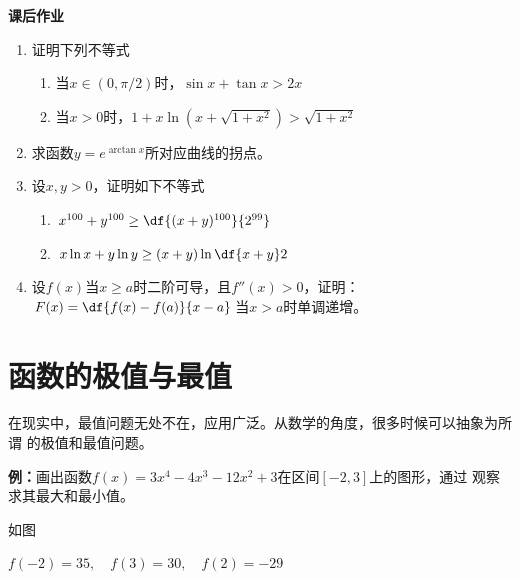 \begin{ext}
	{\bf 课后作业}
	
	\begin{enumerate}
	  \item 证明下列不等式
		\begin{enumerate}[(1)]
		  \item 当$x\in(0,\pi/2)$时，$\sin x+\tan x>2x$
		  \item 当$x>0$时，$1+x\ln(x+\sqrt{1+x^2})>\sqrt{1+x^2}$
		\end{enumerate}
	  \item 求函数$y=e^{\arctan x}$所对应曲线的拐点。
	  \item 设$x,y>0$，证明如下不等式
	  \begin{enumerate}[(1)]
		\item $x^{100}+y^{100}\geq\df{(x+y)^{100}}{2^{99}}$
		\item $x\ln x+y\ln y\geq (x+y)\ln\df{x+y}2$
	  \end{enumerate}
	  \item 设$f(x)$当$x\geq a$时二阶可导，且$f''(x)>0$，证明：
	  $F(x)=\df{f(x)-f(a)}{x-a}$当$x>a$时单调递增。
	\end{enumerate}
\end{ext}

\section{函数的极值与最值}

在现实中，最值问题无处不在，应用广泛。从数学的角度，很多时候可以抽象为所谓
的极值和最值问题。

{\bf 例：}画出函数$f(x)=3x^4-4x^3-12x^2+3$在区间$[-2,3]$上的图形，通过
观察求其最大和最小值。

如图
\begin{center}
	
	$f(-2)=35,\quad f(3)=30,\quad f(2)=-29$
\end{center}

